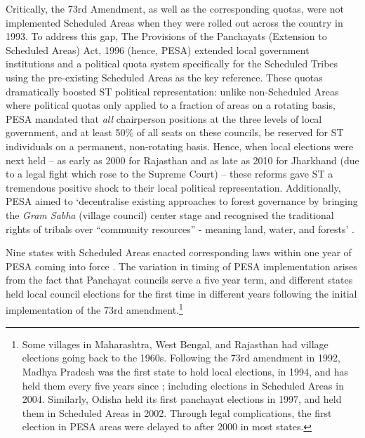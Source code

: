 \documentclass[12pt,reqno]{article}
\begin{document}
Critically, the 73rd Amendment, as well as the corresponding quotas, were not implemented  Scheduled Areas when they were rolled out across the country in 1993. To address this gap, The Provisions of the Panchayats (Extension to Scheduled Areas) Act, 1996 (hence, PESA) extended local government institutions and a political quota system specifically for the Scheduled Tribes using the pre-existing Scheduled Areas as the key reference. These quotas dramatically boosted ST political representation: unlike non-Scheduled Areas where political quotas only applied to a fraction of areas on a rotating basis, PESA mandated that {\it all} chairperson positions at the three levels of local government, and at least 50\% of all seats on these councils, be reserved for ST individuals on a permanent, non-rotating basis. Hence, when local elections were next held -- as early as 2000 for Rajasthan and as late as 2010 for Jharkhand (due to a legal fight which rose to the Supreme Court) -- these reforms gave ST a tremendous positive shock to their local political representation. Additionally, PESA aimed to `decentralise existing approaches to forest governance by bringing the \emph{Gram Sabha} (village council) center stage and recognised the traditional rights of tribals over ``community resources'' - meaning land, water, and forests' \parencite[p 5]{Patnaik2007-ku}. 




Nine states with Scheduled Areas enacted corresponding laws within one year of PESA coming into force \parencite{Bijoy2012-gz}. The variation in timing of PESA implementation arises from the fact that Panchayat councils serve a five year term, and different states held local council elections for the first time in different years following the initial implementation of the 73rd amendment.\footnote{Some villages in Maharashtra, West Bengal, and Rajasthan had village elections going back to the 1960s. Following the 73rd amendment in 1992, Madhya Pradesh was the first state to hold local elections, in 1994, and has held them every five years since \parencite{Commonwealth_Human_Rights_Initiative2006-vo}; including elections in Scheduled Areas in 2004. Similarly, Odisha held its first panchayat elections in 1997, and held them in Scheduled Areas in 2002. Through legal complications, the first election in PESA areas were delayed to after 2000 in most states.} 
\end{document}
